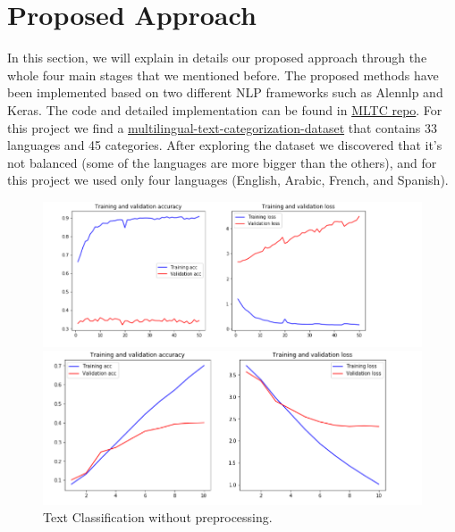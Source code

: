 \documentclass[letterpaper,12pt]{article}
\begin{document}
\section{Proposed Approach}
In this section, we will explain in details our proposed approach through the whole four main stages that we mentioned before. The proposed methods have been implemented based on two different NLP frameworks such as Alennlp \cite{allen} and Keras. The code and detailed implementation can be found in \href{https://github.com/Mkamel104/MLTC}{MLTC repo}. For this project we find a  
 \href{https://github.com/valeriano-manassero/multilingual-text-categorization-dataset}{multilingual-text-categorization-dataset} that contains 33 languages and 45 categories. After exploring the dataset we discovered that it's not balanced (some of the languages are more bigger than the others), and for this project we used only four languages (English, Arabic, French, and Spanish).




\begin{figure}
	\centering
	\begin{minipage}[b]{.4\textwidth}
		\centering \includegraphics[width=0.8\columnwidth]{w.png}
		
		\caption{
			\label{fig:3} %
			Text classification with preprocessing
		}
		
	\end{minipage}\qquad
	\begin{minipage}[b]{.4\textwidth}
		
		\centering \includegraphics[width=0.8\columnwidth]{without.png}
		
		\caption{
			\label{fig:4} %
			Text Classification without preprocessing.
		}
		
	\end{minipage}
\end{figure}
\end{document}
